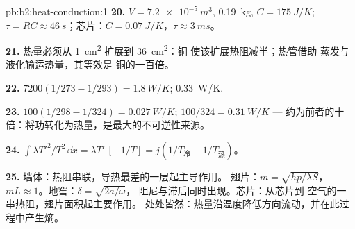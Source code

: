 \begin{solution}{pb:b2:heat-conduction:1}
\textbf{20.} $V = \qty{7.2e-5}{m^3}$, \qty{0.19}{kg}, $C = \qty{175}{J/K}$; $\tau = RC
\approx \qty{46}{s}$；芯片：$C = \qty{0.07}{J/K}$，$\tau \approx \qty{3}{ms}$。

\textbf{21.} 热量必须从 \qty{1}{cm^2} 扩展到 \qty{36}{cm^2}：铜
使该扩展热阻减半；热管借助
蒸发与液化输运热量，其等效是
铜的一百倍。

\textbf{22.} $7200(1/273 - 1/293) = \qty{1.8}{W/K}$; \qty{0.33}{W/K}.

\textbf{23.} $100(1/298 - 1/324) = \qty{0.027}{W/K}$; $100/324 = \qty{0.31}{W/K}$ ---
约为前者的十倍：将功转化为热量，是最大的不可逆性来源。

\textbf{24.} $\int\lambda T'^2/T^2\,\dd x = \lambda T'\,[-1/T] = j(1/T_{\text{冷}} -
1/T_{\text{热}})$。

\textbf{25.} 墙体：热阻串联，导热最差的一层起主导作用。
翅片：$m = \sqrt{hp/\lambda S}$，$mL \approx 1$。地窖：$\delta = \sqrt{2a/\omega}$，
阻尼与滞后同时出现。芯片：从芯片到
空气的一串热阻，翅片面积起主要作用。
处处皆然：热量沿温度降低方向流动，并在此过程中产生熵。
\end{solution}
